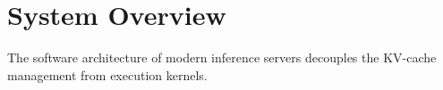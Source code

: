 \section{System Overview}
The software architecture of modern inference servers decouples the KV-cache management from execution kernels.
